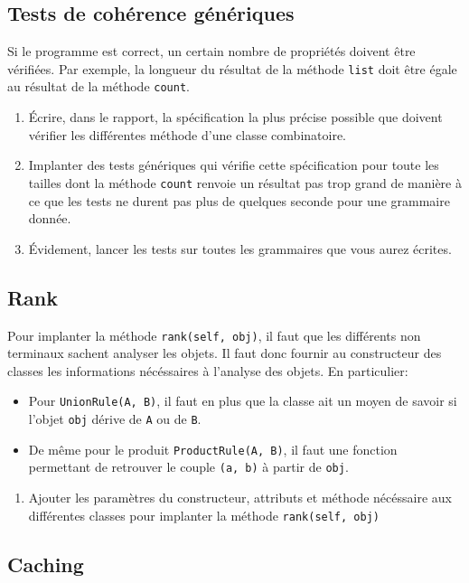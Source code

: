 \documentclass[11pt]{article}
\newcounter{asuivre}
\newenvironment{asks}{\begin{enumerate}\setcounter{enumi}{\theasuivre}}%
                       {\setcounter{asuivre}{\theenumi}\end{enumerate}}
\begin{document}
\subsection{Tests de cohérence génériques}

Si le programme est correct, un certain nombre de propriétés doivent être
vérifiées. Par exemple, la longueur du résultat de la méthode \texttt{list}
doit être égale au résultat de la méthode \texttt{count}.
\begin{asks}
\item Écrire, dans le rapport, la spécification la plus précise possible que
  doivent vérifier les différentes méthode d'une classe combinatoire.
\item Implanter des tests génériques qui vérifie cette spécification pour
  toute les tailles dont la méthode \texttt{count} renvoie un résultat pas
  trop grand de manière à ce que les tests ne durent pas plus de quelques
  seconde pour une grammaire donnée.
\item Évidement, lancer les tests sur toutes les grammaires que vous aurez
  écrites.
\end{asks}

\subsection{Rank}

Pour implanter la méthode \texttt{rank(self, obj)}, il faut que les différents
non terminaux sachent analyser les objets. Il faut donc fournir au constructeur
des classes les informations nécéssaires à l'analyse des objets. En particulier:
\begin{itemize}
\item Pour \texttt{UnionRule(A, B)}, il faut en plus que la classe ait un
  moyen de savoir si l'objet \texttt{obj} dérive de \texttt{A} ou de
  \texttt{B}.
\item De même pour le produit \texttt{ProductRule(A, B)}, il faut une fonction
  permettant de retrouver le couple \texttt{(a, b)} à partir de \texttt{obj}.
\end{itemize}
\begin{asks}
\item Ajouter les paramètres du constructeur, attributs et méthode nécéssaire
  aux différentes classes pour implanter la méthode \texttt{rank(self, obj)}
\end{asks}

\subsection{Caching}
\end{document}
